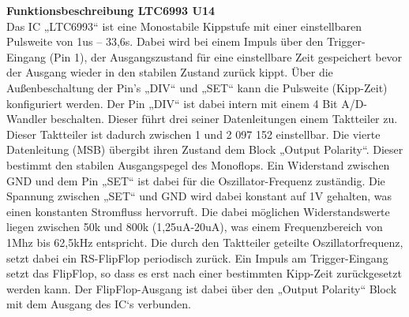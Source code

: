 \textbf{Funktionsbeschreibung LTC6993 U14}
\\
Das IC „LTC6993“ ist eine Monostabile Kippstufe mit einer einstellbaren Pulsweite von 1us – 33,6s. Dabei wird bei einem Impuls über den Trigger-Eingang (Pin 1), der Ausgangszustand für eine einstellbare Zeit gespeichert bevor der Ausgang wieder in den stabilen Zustand zurück kippt. Über die Außenbeschaltung der Pin’s „DIV“ und „SET“ kann die Pulsweite (Kipp-Zeit) konfiguriert werden. Der Pin „DIV“ ist dabei intern mit einem 4 Bit A/D-Wandler beschalten. Dieser führt drei seiner Datenleitungen einem Taktteiler zu. Dieser Taktteiler ist dadurch zwischen 1 und 2 097 152 einstellbar. Die vierte Datenleitung (MSB) übergibt ihren Zustand dem Block „Output Polarity“. Dieser bestimmt den stabilen Ausgangspegel des Monoflops. Ein Widerstand zwischen GND und dem Pin „SET“ ist dabei für die Oszillator-Frequenz zuständig. Die Spannung zwischen „SET“ und GND wird dabei konstant auf 1V gehalten, was einen konstanten Stromfluss hervorruft. Die dabei möglichen Widerstandswerte liegen zwischen 50k und 800k (1,25uA-20uA), was einem Frequenzbereich von 1Mhz bis 62,5kHz entspricht. Die durch den Taktteiler geteilte Oszillatorfrequenz, setzt dabei ein RS-FlipFlop periodisch zurück. Ein Impuls am Trigger-Eingang setzt das FlipFlop, so dass es erst nach einer bestimmten Kipp-Zeit zurückgesetzt werden kann. Der FlipFlop-Ausgang ist dabei über den „Output Polarity“ Block mit dem Ausgang des IC‘s verbunden.

\newpage

